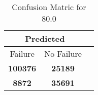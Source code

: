 \begin{table}[] 
\label{Table: Prediction Accuracy-DMD80.0OnlySunEKF-resetReflection-Reflection} 
\caption{Confusion Matric for 80.0} 
\centering 
\begin{tabular} 
 {@{}ccc@{}} 
\toprule 
\multicolumn{2}{c}{\textbf{Predicted}}
 \\ \midrule 
\multicolumn{1}{|c|}{Failure} & 
\multicolumn{1}{c|}{No Failure}
 \\ \midrule 
\multicolumn{1}{|c|}{\color{green}\textbf{100376}} & 
\multicolumn{1}{c|}{\color{red}\textbf{25189}}
 \\ \midrule 
\multicolumn{1}{|c|}{\color{red}\textbf{8872}} & 
\multicolumn{1}{c|}{\color{green}\textbf{35691}}
 \\ \bottomrule 
\end{tabular} 
\end{table} 

